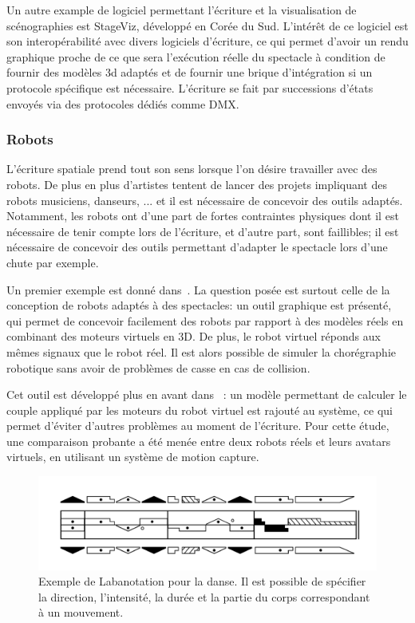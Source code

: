 \documentclass[french,12pt]{article}
\begin{document}
Un autre example de logiciel permettant l'écriture et la visualisation de scénographies est StageViz\cite{lee_stageviz:_2013}, développé en Corée du Sud.
L'intérêt de ce logiciel est son interopérabilité avec divers logiciels d'écriture, ce qui permet d'avoir un rendu graphique proche de 
ce que sera l'exécution réelle du spectacle à condition de fournir des modèles 3d adaptés et de fournir une brique d'intégration si un protocole spécifique est nécessaire. 
L'écriture se fait par successions d'états envoyés via des protocoles dédiés comme DMX.

\subsubsection{Robots}
L'écriture spatiale prend tout son sens lorsque l'on désire travailler avec des robots. De plus en plus d'artistes tentent de lancer des projets impliquant des robots musiciens, danseurs, ... et il est nécessaire de concevoir des outils adaptés. 
Notamment, les robots ont d'une part de fortes contraintes physiques dont il est nécessaire de tenir compte lors de l'écriture, et d'autre part, sont faillibles; il est nécessaire de concevoir des outils permettant d'adapter le spectacle lors d'une chute par exemple.

Un premier exemple est donné dans~\cite{lee_visualization_2013}. La question posée est surtout celle de la conception de robots adaptés à des spectacles:  un outil graphique est présenté, qui permet de concevoir facilement des robots par rapport à des modèles réels en combinant des moteurs virtuels en 3D. De plus, le robot virtuel réponds aux mêmes signaux que le robot réel. Il est alors possible de simuler la chorégraphie robotique sans avoir de problèmes de casse en cas de collision.

Cet outil est développé plus en avant dans~\cite{lee_virtual_2014} : un modèle permettant de calculer le couple appliqué par les moteurs du robot virtuel est rajouté au système, ce qui permet d'éviter d'autres problèmes au moment de l'écriture.
Pour cette étude, une comparaison probante a été menée entre deux robots réels et leurs avatars virtuels, en utilisant un système de motion capture.

\begin{figure}[h]
    \centering
    \includegraphics[scale=0.35]{images/Labanotation.png}
    \caption{Exemple de Labanotation pour la danse. Il est possible de spécifier la direction, l'intensité, la durée et la partie du corps correspondant à un mouvement.}
    \label{fig.labanotation}
\end{figure}
\end{document}
